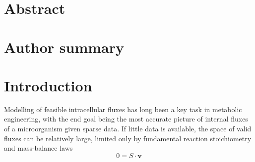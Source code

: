 \documentclass[10pt,letterpaper]{article}
\begin{document}
\section*{Abstract}


\section*{Author summary}


\linenumbers

\section*{Introduction}

Modelling of feasible intracellular fluxes has long been a key task in metabolic engineering, with the end goal being the most accurate picture of internal fluxes of a microorganism given sparse data.
If little data is available, the space of valid fluxes can be relatively large, limited only by fundamental reaction stoichiometry and mass-balance laws
\[
    \label{eq:steady_state}
    0 = S\cdot \mathbf{v}
\]
\end{document}
